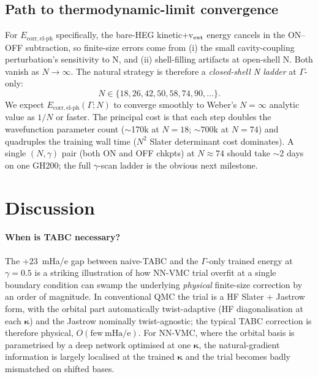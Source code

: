 \documentclass[reprint,amsmath,amssymb,aps,prb,floatfix,nofootinbib]{revtex4-2}
\newcommand{\Ehp}{E_{\mathrm{corr},\mathrm{el}\text{-}\mathrm{ph}}}
\begin{document}
\subsection{Path to thermodynamic-limit convergence}\label{sec:N-discussion}
For $\Ehp$ specifically, the bare-HEG kinetic+v$_{\rm ext}$ energy
cancels in the ON--OFF subtraction, so finite-size errors come from
(i) the small cavity-coupling perturbation's sensitivity to N, and
(ii) shell-filling artifacts at open-shell N.  Both vanish as
$N \to \infty$.  The natural strategy is therefore a \emph{closed-shell
N ladder} at $\Gamma$-only:
\begin{equation}
N \in \{18, 26, 42, 50, 58, 74, 90, \ldots\}.
\end{equation}
We expect $\Ehp(\Gamma; N)$ to converge smoothly to Weber's
$N{=}\infty$ analytic value as $1/N$ or faster.  The principal cost
is that each step doubles the wavefunction parameter count
($\sim$170k at $N=18$; $\sim$$700$k at $N=74$) and quadruples the
training wall time ($N^2$ Slater determinant cost dominates).  A
single $(N, \gamma)$ pair (both ON and OFF chkpts) at $N \approx 74$
should take $\sim$2 days on one GH200; the full $\gamma$-scan ladder
is the obvious next milestone.

\section{Discussion}\label{sec:discussion}
\paragraph{When is TABC necessary?}
The $+23$~mHa/e gap between naive-TABC and the $\Gamma$-only trained
energy at $\gamma = 0.5$ is a striking illustration of how NN-VMC
trial overfit at a single boundary condition can swamp the underlying
\emph{physical} finite-size correction by an order of magnitude.  In
conventional QMC the trial is a HF Slater + Jastrow form, with the
orbital part automatically twist-adaptive (HF diagonalisation at each
$\bm\kappa$) and the Jastrow nominally twist-agnostic; the typical
TABC correction is therefore physical, $O(\mathrm{few~mHa/e})$.
For NN-VMC, where the orbital basis is parametrised by a deep
network optimised at one $\bm\kappa$, the natural-gradient
information is largely localised at the trained $\bm\kappa$ and
the trial becomes badly mismatched on shifted bases.
\end{document}

